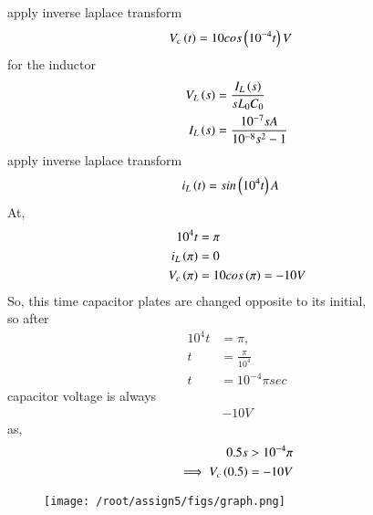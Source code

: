 \documentclass[journal,12pt,twocolumn]{IEEEtran}
\theoremstyle{remark}
\begin{document}
apply inverse laplace transform
\begin{align}
    V_c\left(t\right)&=10cos\left(10^{-4}t\right)V
\end{align} 
for the inductor
\begin{align}
    V_{L}\left(s\right)&=\frac{I_L\left(s\right)}{sL_{0}C_{0}}\\ 
    I_L\left(s\right)&=\frac{10^{-7}sA}{10^{-8}s^2-1}
\end{align}
apply inverse laplace transform
\begin{align}
    i_L\left(t\right)&=sin\left(10^4t\right)A
    \end{align}
    At,
    \begin{align}
    10^4t&=\pi\\
    i_L\left(\pi\right)&=0\\
    V_{c}\left(\pi\right)&=10cos\left(\pi\right)=-10V
\end{align}
So, this time capacitor plates are changed opposite to its initial,\\
so after \begin{align}
10^4t&=\pi,\\
t&=\frac{\pi}{10^4}\\
t&=10^{-4}\pi sec 
\end{align}
 capacitor voltage is always
\begin{align}
    -10V
\end{align}
as,
\begin{align}
0.5s&>10^{-4}\pi\\
\implies V_{c}\left(0.5\right)&=-10V
\end{align}
\begin{figure}[th]
\centering
\texttt{[image: /root/assign5/figs/graph.png]}
\caption{}
\end{figure}
\end{document}
